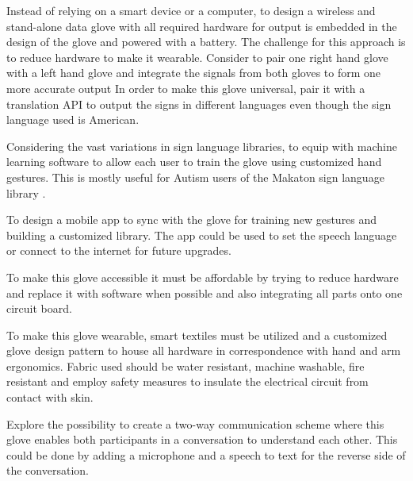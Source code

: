 Instead of relying on a smart device or a computer, to design a wireless and stand-alone data glove with all required hardware for output is embedded in the design of the glove and powered with a battery. The challenge for this approach is to reduce hardware to make it wearable. 
Consider to pair one right hand glove with a left hand glove and integrate the signals from both gloves to form one more accurate output
In order to make this glove universal, pair it with a translation API to output the signs in different languages even though the sign language used is American.

Considering the vast variations in sign language libraries, to equip with machine learning software to allow each user to train the glove using customized hand gestures. This is mostly useful for Autism users of the Makaton sign language library \parencite{Makaton}. 

To design a mobile app to sync with the glove for training new gestures and building a customized library. The app could be used to set the speech language or connect to the internet for future upgrades.

To make this glove accessible it must be affordable by trying to reduce hardware and replace it with software when possible and also integrating all parts onto one circuit board. 

To make this glove wearable, smart textiles must be utilized and a customized glove design pattern to house all hardware in correspondence with hand and arm ergonomics. Fabric used should be water resistant, machine washable, fire resistant and employ safety measures to insulate the electrical circuit from contact with skin. 

Explore the possibility to create a two-way communication scheme where this glove enables both participants in a conversation to understand each other. This could be done by adding a microphone and a speech to text for the reverse side of the conversation. 